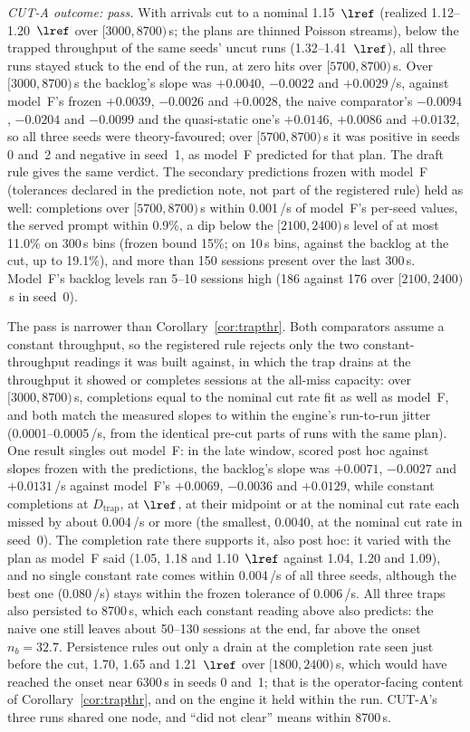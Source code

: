 \begin{itemize}[leftmargin=*,nosep]
\emph{CUT-A outcome: pass.} With arrivals cut to a nominal 1.15~$\lref$ (realized 1.12--1.20~$\lref$ over $[3000,8700)$\,s; the
plans are thinned Poisson streams), below the trapped throughput of the same seeds' uncut runs (1.32--1.41~$\lref$), all three runs
stayed stuck to the end of the run, at zero hits over $[5700,8700)$\,s. Over $[3000,8700)$\,s the backlog's slope was $+0.0040$,
$-0.0022$ and $+0.0029$\,/s, against model~F's frozen $+0.0039$, $-0.0026$ and $+0.0028$, the naive comparator's $-0.0094$, $-0.0204$
and $-0.0099$ and the quasi-static one's $+0.0146$, $+0.0086$ and $+0.0132$, so all three seeds were theory-favoured; over
$[5700,8700)$\,s it was positive in seeds 0 and~2 and negative in seed~1, as model~F predicted for that plan. The draft rule gives
the same verdict. The secondary predictions frozen with model~F (tolerances declared in the prediction note, not part of the registered
rule) held as well: completions over $[5700,8700)$\,s within 0.001\,/s of model~F's per-seed values, the served prompt within 0.9\%, a
dip below the $[2100,2400)$\,s level of at most 11.0\% on 300\,s bins (frozen bound 15\%; on 10\,s bins, against the backlog at the
cut, up to 19.1\%), and more than 150 sessions present over the last 300\,s. Model~F's backlog levels ran 5--10 sessions high (186
against 176 over $[2100,2400)$\,s in seed~0).

The pass is narrower than Corollary~\ref{cor:trapthr}. Both comparators assume a constant throughput, so the registered rule
rejects only the two constant-throughput readings it was built against, in which the trap drains at the throughput it showed or completes sessions at
the all-miss capacity: over $[3000,8700)$\,s, completions equal to the nominal cut rate fit as well as model~F, and both match the
measured slopes to within the engine's run-to-run jitter (0.0001--0.0005\,/s, from the identical pre-cut parts of runs with the same
plan). One result singles out model~F: in the late window, scored post hoc against slopes frozen with the predictions, the
backlog's slope was $+0.0071$, $-0.0027$ and $+0.0131$\,/s against model~F's $+0.0069$, $-0.0036$ and $+0.0129$, while constant
completions at $D_{\mathrm{trap}}$, at $\lref$, at their midpoint or at the nominal cut rate each missed by about 0.004\,/s or more
(the smallest, 0.0040, at the nominal cut rate in seed~0). The completion rate there supports it, also post hoc: it varied with the
plan as model~F said (1.05, 1.18 and 1.10~$\lref$ against 1.04, 1.20 and 1.09), and no single constant rate comes within 0.004\,/s
of all three seeds, although the best one (0.080\,/s) stays within the frozen tolerance of 0.006\,/s. All three traps also
persisted to 8700\,s, which each constant reading above also predicts: the naive one still leaves about 50--130 sessions at the end,
far above the onset $n_b=32.7$. Persistence rules out only a drain at the completion rate seen just before the cut, 1.70, 1.65 and
1.21~$\lref$ over $[1800,2400)$\,s, which would have reached the onset near 6300\,s in seeds 0 and~1; that is the operator-facing
content of Corollary~\ref{cor:trapthr}, and on the engine it held within the run. CUT-A's three runs shared one node, and ``did not
clear'' means within 8700\,s.


\end{itemize}
